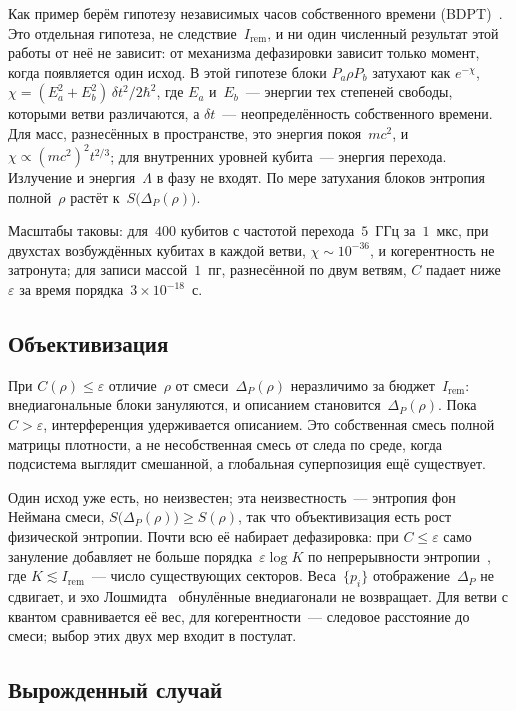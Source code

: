 \documentclass[11pt,a4paper]{article}
\newcommand{\Ost}{I_{\mathrm{rem}}}
\begin{document}
Как пример берём гипотезу независимых часов собственного времени (BDPT)~\cite{ponfilenok2026bdpt}. Это отдельная гипотеза, не следствие~$\Ost$, и ни один численный результат этой работы от неё не зависит: от механизма дефазировки зависит только момент, когда появляется один исход. В этой гипотезе блоки $P_a\rho P_b$ затухают как $e^{-\chi}$, $\chi=(E_a^2+E_b^2)\,\delta t^2/2\hbar^2$, где $E_a$ и~$E_b$~--- энергии тех степеней свободы, которыми ветви различаются, а $\delta t$~--- неопределённость собственного времени. Для масс, разнесённых в пространстве, это энергия покоя~$mc^2$, и $\chi\propto(mc^2)^2t^{2/3}$; для внутренних уровней кубита~--- энергия перехода. Излучение и энергия~$\Lambda$ в фазу не входят. По мере затухания блоков энтропия полной~$\rho$ растёт к~$S\bigl(\Delta_P(\rho)\bigr)$.

Масштабы таковы: для~$400$ кубитов с частотой перехода~$5$~ГГц за~$1$~мкс, при двухстах возбуждённых кубитах в каждой ветви, $\chi\sim10^{-36}$, и когерентность не затронута; для записи массой~$1$~пг, разнесённой по двум ветвям, $C$ падает ниже~$\varepsilon$ за время порядка~$3\times10^{-18}$~с.

\subsection{Объективизация}
\label{sec:objectivation}

При $C(\rho)\le\varepsilon$ отличие~$\rho$ от смеси~$\Delta_P(\rho)$ неразличимо за бюджет~$\Ost$: внедиагональные блоки зануляются, и описанием становится~$\Delta_P(\rho)$. Пока $C>\varepsilon$, интерференция удерживается описанием. Это собственная смесь полной матрицы плотности, а не несобственная смесь от следа по среде, когда подсистема выглядит смешанной, а глобальная суперпозиция ещё существует.

Один исход уже есть, но неизвестен; эта неизвестность~--- энтропия фон Неймана смеси, $S\bigl(\Delta_P(\rho)\bigr)\ge S(\rho)$, так что объективизация есть рост физической энтропии. Почти всю её набирает дефазировка: при $C\le\varepsilon$ само зануление добавляет не больше порядка~$\varepsilon\log K$ по непрерывности энтропии~\cite{fannes1973,audenaert2007}, где $K\lesssim\Ost$~--- число существующих секторов. Веса~$\{p_i\}$ отображение~$\Delta_P$ не сдвигает, и эхо Лошмидта~\cite{swingle2018} обнулённые внедиагонали не возвращает. Для ветви с квантом сравнивается её вес, для когерентности~--- следовое расстояние до смеси; выбор этих двух мер входит в постулат.

\subsection{Вырожденный случай}
\label{sec:degenerate}
\end{document}
